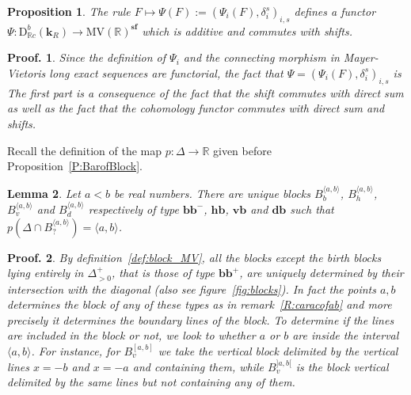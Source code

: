 \documentclass[a4paper, english, 11pt]{article}
\newcommand{\kk}[0]{\textbf{k}}
\newcommand{\0}{\vec{0}}
\newcommand{\R}[0]{\mathbb{R}}
\newcommand{\D}[0]{\text{D}}
\newcommand{\MV}{\text{MV}}
\newcommand{\s}{\textbf{sf}}
\newtheorem{prop}{Proposition}[section]
\newtheorem*{pf}{Proof.} }
\newtheorem{lem}[prop]{Lemma}
\begin{document}
\begin{prop}\label{P:PropertiesofPsi}
The rule $F\mapsto \Psi(F):= (\Psi_i(F), \delta_i^s)_{i,s}$ defines a functor $\Psi: \D^b_{\R c}(\kk_R)\to \MV(\R)^\s$ 
which is additive and commutes with shifts.
\end{prop}
\begin{pf} Since the definition of $\Psi_i$ and the connecting morphism in Mayer-Vietoris long exact sequences are functorial, the fact that $\Psi= (\Psi_i(F), \delta^s_i)_{i,s}$ is 
The first part is a consequence of the fact that the shift commutes with direct sum as well as the fact that the cohomology functor commutes with direct sum and shifts. 
\end{pf}
Recall the definition of the map $p: \Delta\to \R$ given before Proposition~\ref{P:BarofBlock}.
\begin{lem}\label{L:Blockassociatedtointerval}
 Let  $a<b$ be real numbers. There are unique  blocks $B_{b}^{\langle a, b\rangle}$, $B_{h}^{\langle a, b\rangle}$, $B_{v}^{\langle a, b\rangle}$ and $B_{d}^{\langle a, b\rangle}$ respectively of type $\textbf{bb}^{-}$, $\textbf{hb}$, $\textbf{vb}$ and $\textbf{db}$ such that $p(\Delta\cap B_{?}^{\langle a, b\rangle}) = \langle a,b \rangle$. 
\end{lem}
\begin{pf}
By definition~\ref{def:block_MV}, all the blocks except the birth blocks lying entirely in $\Delta^+_{>0}$, that is those of type $\textbf{bb}^{+}$,  are uniquely determined by their intersection with the diagonal (also see figure~\ref{fig:blocks}). In fact the points $a, b$ determines the block of any of these types as in remark~\ref{R:caracofab} and more precisely it determines the boundary lines of the block. To determine if the lines are included in the block or not, we look to whether $a$ or $b$ are inside the interval $\langle a, b\rangle$. For instance, for $B_v^{[a,b]}$ we take the vertical block delimited by the vertical lines $x=-b$ and $x=-a$ and containing them, while $B_v^{]a,b[}$ is the block vertical delimited by the same lines but not containing any of them. 
\end{pf}
\end{document}
